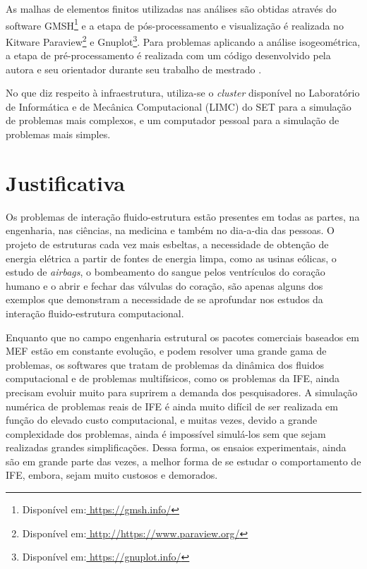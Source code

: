 \documentclass[tese_patricia.tex]{subfiles}
\begin{document}
As malhas de elementos finitos utilizadas nas análises são obtidas através do software GMSH\footnote{Disponível em:\url{ https://gmsh.info/}} e a etapa de pós-processamento e visualização é realizada no Kitware Paraview\footnote{Disponível em:\url{ http://https://www.paraview.org/}} e  Gnuplot\footnote{Disponível em:\url{ https://gnuplot.info/}}. Para problemas aplicando a análise isogeométrica, a etapa de pré-processamento é realizada com um código desenvolvido pela autora e seu orientador durante seu trabalho de mestrado \cite{Tonon:2016}.

No que diz respeito à infraestrutura, utiliza-se o \textit{cluster} disponível no Laboratório de Informática e de Mecânica Computacional (LIMC) do SET para a simulação de problemas mais complexos, e um computador pessoal para a simulação de problemas mais simples.

 \section[Justificativa]{Justificativa}

Os problemas de interação fluido-estrutura estão presentes em todas as partes, na engenharia, nas ciências, na medicina e também no dia-a-dia das pessoas.
O projeto de estruturas cada vez mais esbeltas, a necessidade de obtenção de energia elétrica a partir de fontes de energia limpa, como as usinas eólicas, o estudo de \textit{airbags}, o bombeamento do sangue pelos ventrículos do coração humano e o abrir e fechar das válvulas do coração, são apenas alguns dos exemplos que demonstram a necessidade de se aprofundar nos estudos da interação fluido-estrutura computacional.

Enquanto que no campo engenharia estrutural os pacotes comerciais baseados em MEF estão em constante evolução, e podem resolver uma grande gama de problemas, os softwares que tratam de problemas da dinâmica dos fluidos computacional e de problemas multifísicos, como os problemas da IFE, ainda precisam evoluir muito para suprirem a demanda dos pesquisadores. A simulação numérica de problemas reais de IFE é ainda muito difícil de ser realizada em função do elevado custo computacional, e muitas vezes, devido a grande complexidade dos problemas, ainda é impossível simulá-los sem que sejam realizadas grandes simplificações. Dessa forma, os ensaios experimentais, ainda são em grande parte das vezes, a melhor forma de se estudar o comportamento de IFE, embora, sejam muito custosos e demorados.
\end{document}
